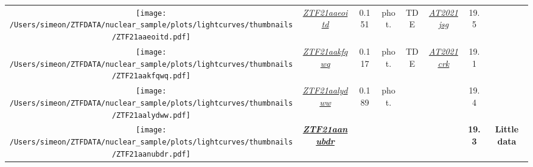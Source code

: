 \begin{table*}
{\begin{tabular}{c c  c  c  c   c  c  c}
      \parbox[c]{12em}{\texttt{[image: /Users/simeon/ZTFDATA/nuclear\_sample/plots/lightcurves/thumbnails/ZTF21aaeoitd.pdf]}} & \textit{\href{https://ztfnuclear.simeonreusch.com/transient/ZTF21aaeoitd}{ZTF21aaeoitd}}          & 0.151          & phot.                   & TDE               &
      \textit{\href{https://www.wis-tns.org/object/2021jsg}{AT2021jsg}}                                                                           & 19.5                                                                                              &                                                                                                                                   \\
      \parbox[c]{12em}{\texttt{[image: /Users/simeon/ZTFDATA/nuclear\_sample/plots/lightcurves/thumbnails/ZTF21aakfqwq.pdf]}} & \textit{\href{https://ztfnuclear.simeonreusch.com/transient/ZTF21aakfqwq}{ZTF21aakfqwq}}          & 0.117          & phot.                   & TDE               &
      \textit{\href{https://www.wis-tns.org/object/2021crk}{AT2021crk}}                                                                           & 19.1                                                                                              &                                                                                                                                   \\
      \parbox[c]{12em}{\texttt{[image: /Users/simeon/ZTFDATA/nuclear\_sample/plots/lightcurves/thumbnails/ZTF21aalydww.pdf]}} & \textit{\href{https://ztfnuclear.simeonreusch.com/transient/ZTF21aalydww}{ZTF21aalydww}}          & 0.189          & phot.                   & ~                 & ~                          & 19.4           &                      \\
      \parbox[c]{12em}{\texttt{[image: /Users/simeon/ZTFDATA/nuclear\_sample/plots/lightcurves/thumbnails/ZTF21aanubdr.pdf]}} & \textbf{\textit{\href{https://ztfnuclear.simeonreusch.com/transient/ZTF21aanubdr}{ZTF21aanubdr}}} & ~              & ~                       & ~                 & ~                          & \textbf{19.3}  & \textbf{Little data} \\
    \end{tabular}}
\end{table*}






